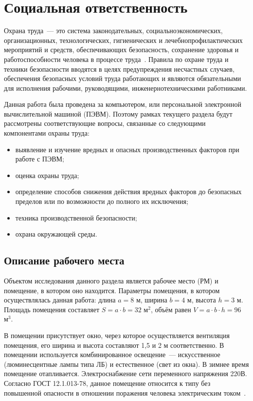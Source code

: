 \section{Социальная ответственность}
\label{section:socialResp}

Охрана труда~--- это система законодательных, социально\-экономических, организационных, технологических, гигиенических и лечебно\-профилактических мероприятий и средств, обеспечивающих безопасность, сохранение здоровья и работоспособности человека в процессе труда~\cite{Osah2016}.
Правила по охране труда и техники безопасности вводятся в целях предупреждения несчастных случаев, обеспечения безопасных условий труда работающих и являются обязательными для исполнения рабочими, руководящими, инженерно\-техническими работниками.

Данная работа была проведена за компьютером, или персональной электронной вычислительной машиной (ПЭВМ).
Поэтому рамках текущего раздела будут рассмотрены соответствующие вопросы, связанные со следующими компонентами охраны труда:

\begin{itemize}
    \item выявление и изучение вредных и опасных производственных факторов при работе с ПЭВМ;
    \item оценка охраны труда;
    \item определение способов снижения действия вредных факторов до безопасных пределов или по возможности до полного их исключения;
    \item техника производственной безопасности;
    \item охрана окружающей среды.
\end{itemize}


\subsection{Описание рабочего места}

Объектом исследования данного раздела является рабочее место (РМ) и помещение, в котором оно находится. 
Параметры помещения, в котором осуществлялась данная работа: длина $a = 8$ м, ширина $b = 4$ м, высота $h = 3$ м. 
Площадь помещения составляет $S = a \cdot b = 32$ $\text{м}^2$, объём равен $V = a \cdot b \cdot h = 96$~$\text{м}^3$.

В помещении присутствует окно, через которое осуществляется вентиляция помещения, его ширина и высота составляют 1,5 и 2 м соответственно.
В помещении используется комбинированное освещение~--- искусственное (люминесцентные лампы типа ЛБ) и естественное (свет из окна). 
В зимнее время помещение отапливается. 
Электроснабжение сети переменного напряжения 220В. 
Согласно ГОСТ 12.1.013-78, данное помещение относится к типу без повышенной опасности в отношении поражения человека электрическим током~\cite{Gost2001}.

